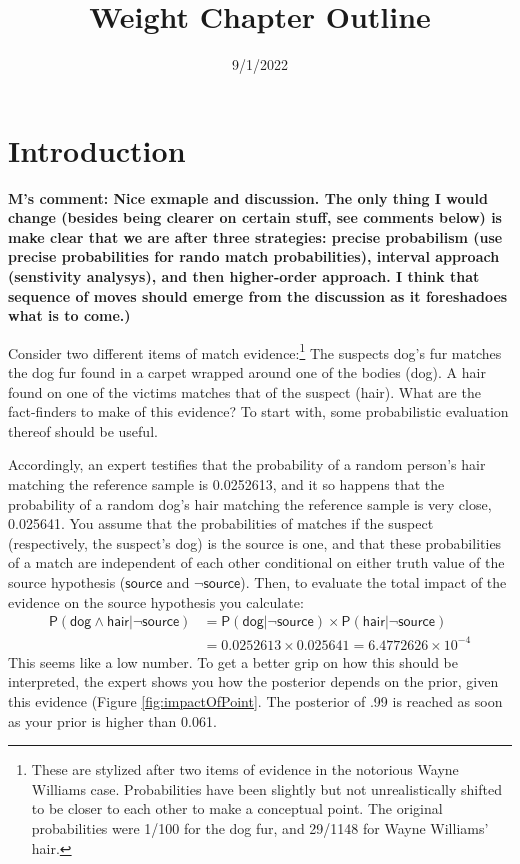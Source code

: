 \documentclass[
  10pt,
  dvipsnames,enabledeprecatedfontcommands]{scrartcl}
\title{Weight Chapter Outline}
\author{}
\date{\vspace{-2.5em}9/1/2022}
\newcommand{\pr}[1]{\mathsf{P}(#1)}
\newcommand{\s}[1]{\mbox{$\mathsf{#1}$}}
\begin{document}
\maketitle

{
\hypersetup{linkcolor=}
\setcounter{tocdepth}{2}
\tableofcontents
}
\hypertarget{introduction}{%
\section{Introduction}\label{introduction}}

\textbf{M's comment: Nice exmaple and discussion. The only thing I would change (besides being clearer on certain stuff, see comments below) is make clear that we are after three strategies: precise probabilism (use precise probabilities for rando match probabilities), interval approach (senstivity analysys), and then higher-order approach. I think that sequence of moves should emerge from the discussion as it foreshadoes what is to come.)}

Consider two different items of match evidence:\footnote{These are
  stylized after two items of evidence in the notorious Wayne Williams
  case. Probabilities have been slightly but not unrealistically shifted
  to be closer to each other to make a conceptual point. The original
  probabilities were 1/100 for the dog fur, and 29/1148 for Wayne
  Williams' hair.} The suspects dog's fur matches the dog fur found in a
carpet wrapped around one of the bodies (\textsf{dog}). A hair found on
one of the victims matches that of the suspect (\textsf{hair}). What are
the fact-finders to make of this evidence? To start with, some
probabilistic evaluation thereof should be useful.


Accordingly, an expert testifies that the probability of a random
person's hair matching the reference sample is 0.0252613, and it so
happens that the probability of a random dog's hair matching the
reference sample is very close, 0.025641. You assume that the
probabilities of matches if the suspect (respectively, the suspect's
dog) is the source is one, and that these probabilities of a match are
independent of each other conditional on either truth value of the
source hypothesis (\(\mathsf{source}\) and \(\neg \mathsf{source}\)).
Then, to evaluate the total impact of the evidence on the source
hypothesis you calculate: \begin{align*}
\pr{\s{dog}\wedge \s{hair} \vert \neg \s{source}} & = \pr{\s{dog} \vert \neg \s{source}} \times \pr{\s{hair} \vert \neg \s{source}} \\
& =  0.0252613 \times  0.025641 = \ensuremath{6.4772626\times 10^{-4}}
\end{align*} This seems like a low number. To get a better grip on how
this should be interpreted, the expert shows you how the posterior
depends on the prior, given this evidence (Figure
\ref{fig:impactOfPoint}. The posterior of .99 is reached as soon as your
prior is higher than 0.061.
\end{document}

